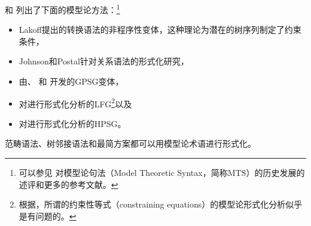  \citet[--20]{PS2001a}和 \citet{Pullum2007a}列出了下面的模型论方法：\footnote{%
可以参见 对模型论句法（Model Theoretic Syntax，简称MTS）的历史发展的述评和更多的参考文献。  
}
\begin{itemize}
\item Lakoff提出的转换语法的非程序性变体，这种理论为潜在的树序列制定了约束条件，
\item Johnson和Postal针对关系语法的形式化研究\citeyearpar{JP80a-u}，
\item 由\citet{GPCKHL88a}、 \citet{BGM93a-u}和 \citet{Rogers97a}开发的GPSG变体\indexgpsgc，
\item  对\citet{Kaplan95a}进行形式化分析的LFG\indexlfgc \footnote{%
 根据\citet[\S~3.2]{Pullum2013a}，所谓的约束性等式（constraining equations）的模型论形式化分析似乎是有问题的。
}以及
\item  对\citet{King99a-u}进行形式化分析的HPSG\indexhpsgc 。
\end{itemize}
范畴语法\indexcgc\citep{BvN94a-u}、树邻接语法\indextagc\citep{RVS94a-u}和最简方案\indexmpc\citep{Veenstra98a}都可以用模型论术语进行形式化。

